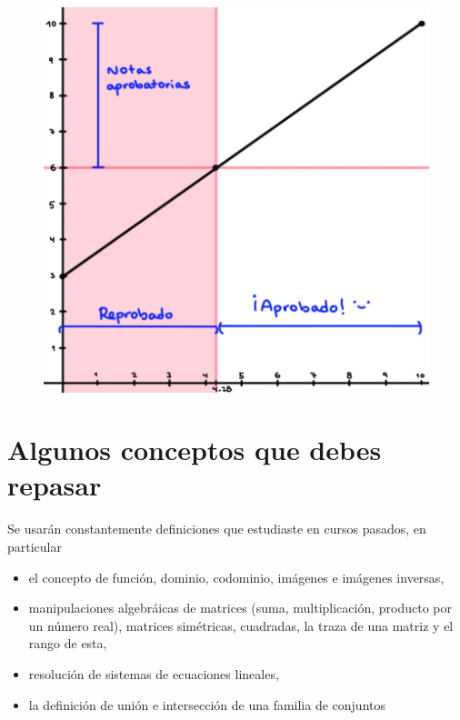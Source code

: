 \documentclass[10pt]{extreport}
\begin{document}
\begin{figure}[H]
    	\centering
    	\includegraphics[scale = 0.3]{graficaCalif}
    \end{figure}


\section{Algunos conceptos que debes repasar}

Se usarán constantemente definiciones que estudiaste en cursos pasados, en particular
\begin{itemize}
	\item el concepto de función, dominio, codominio, imágenes e imágenes inversas,
	\item manipulaciones algebráicas de matrices (suma, multiplicación, producto por un número real), matrices simétricas, cuadradas, la traza de una matriz y el rango de esta,
	\item resolución de sistemas de ecuaciones lineales,
	\item la definición de unión e intersección de una familia de conjuntos
\end{itemize}
\end{document}

